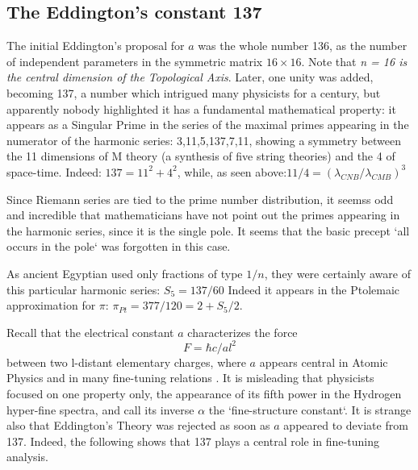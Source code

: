 \documentclass[twoside,draft]{article}
\begin{document}
\begin{sloppypar}
{\subsection{The Eddington's constant 137}

The initial Eddington's proposal for $a$ was the whole number 136, as the number of independent parameters in the symmetric matrix $16 \times 16$. Note that \textit{n = 16 is the central dimension of the Topological Axis}. Later, one unity was added, becoming 137, a number which intrigued many physicists for a century, but apparently nobody highlighted it has a fundamental mathematical property: it appears as a Singular Prime in the series of the maximal primes appearing in the numerator of the harmonic
series: 3,11,5,137,7,11, showing a symmetry between the 11 dimensions of M theory (a synthesis of five string theories) and the 4 of space-time. Indeed: $137 = 11^{2} + 4^{2}$, while, as seen above:$11/4 = (\lambda_{CNB}/\lambda_{CMB})^{3}$

Since Riemann series are tied to the prime number distribution, it seemss odd and incredible that mathematicians
have not point out the primes appearing in the harmonic series, since it is the single pole. It seems
that the basic precept `all occurs in the pole` was forgotten in this case. 

As ancient Egyptian used only fractions of type $1/n$, they were certainly aware of this particular harmonic series: 
$S_{5} = 137/60$
Indeed it appears in the Ptolemaic approximation for $\pi$: $\pi_{Pt} = 377/120 = 2 +  S_{5}/2$.

Recall that the electrical constant $a$ characterizes the force $$F =\hbar c/al^{2}$$ between two l-distant
elementary charges, where $a$ appears central in Atomic Physics and in many fine-tuning relations \cite{Carr}. It is
misleading that physicists focused on one property only, the appearance of its fifth power in the
Hydrogen hyper-fine spectra, and call its inverse $\alpha$ the `fine-structure constant`. It is strange also that
Eddington's Theory was rejected as soon as $a$ appeared to deviate from 137. Indeed, the
following shows that 137 plays a central role in fine-tuning analysis. 

}
\end{sloppypar}
\end{document}
